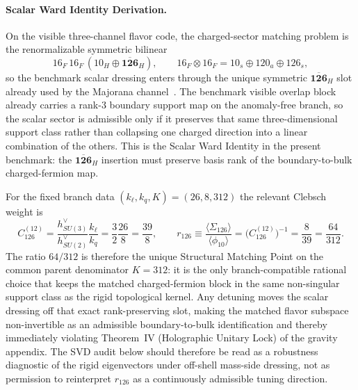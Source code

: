 \documentclass[11pt]{article}
\begin{document}
\paragraph*{Scalar Ward Identity Derivation.}
On the visible three-channel flavor code, the charged-sector matching problem is
the renormalizable symmetric bilinear
\begin{equation}
 16_F\,16_F\,(10_H\oplus\overline{\mathbf{126}}_H),
 \qquad
 16_F\otimes 16_F = 10_s\oplus 120_a\oplus 126_s,
\end{equation}
so the benchmark scalar dressing enters through the unique symmetric
$\overline{\mathbf{126}}_H$ slot already used by the Majorana channel~\cite{georgi1979,babu1993}. The benchmark visible overlap block already carries a
rank-$3$ boundary support map on the anomaly-free branch, so the scalar sector
is admissible only if it preserves that same three-dimensional support class
rather than collapsing one charged direction into a linear combination of the
others. This is the Scalar Ward Identity in the present benchmark: the
$\overline{\mathbf{126}}_H$ insertion must preserve basis rank of the
boundary-to-bulk charged-fermion map.

For the fixed branch data $(k_{\ell},k_q,K)=(26,8,312)$ the relevant Clebsch
weight is
\begin{equation}
 C_{126}^{(12)}
 =
 \frac{h^{\vee}_{SU(3)}}{h^{\vee}_{SU(2)}}\frac{k_{\ell}}{k_q}
 =
 \frac{3}{2}\frac{26}{8}
 =
 \frac{39}{8},
 \qquad
 r_{126}\equiv\frac{\langle \Sigma_{126} \rangle}{\langle \phi_{10} \rangle}
 =
 \bigl(C_{126}^{(12)}\bigr)^{-1}
 =
 \frac{8}{39}
 =
 \frac{64}{312}.
\end{equation}
The ratio $64/312$ is therefore the unique Structural Matching Point on the
common parent denominator $K=312$: it is the only branch-compatible rational
choice that keeps the matched charged-fermion block in the same non-singular
support class as the rigid topological kernel. Any detuning moves the scalar
dressing off that exact rank-preserving slot, making the matched flavor
subspace non-invertible as an admissible boundary-to-bulk identification and
thereby immediately violating Theorem~IV (Holographic Unitary Lock) of the
gravity appendix. The SVD audit below should therefore be read as a robustness
diagnostic of the rigid eigenvectors under off-shell mass-side dressing, not as
permission to reinterpret $r_{126}$ as a continuously admissible tuning
direction.
\end{document}

